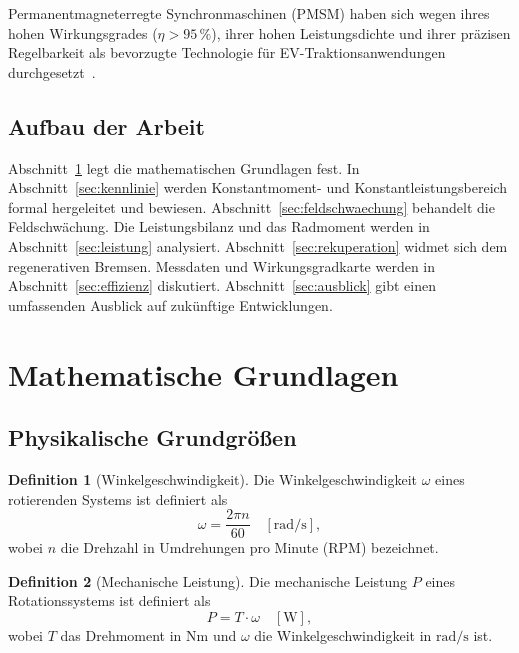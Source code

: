﻿\documentclass[a4paper,12pt]{article}
\theoremstyle{definition}
\newtheorem{definition}{Definition}
\begin{document}
Permanentmagneterregte Synchronmaschinen (PMSM) haben sich wegen ihres hohen
Wirkungsgrades ($\eta > 95\,\%$), ihrer hohen Leistungsdichte und ihrer präzisen
Regelbarkeit als bevorzugte Technologie für EV-Traktionsanwendungen
durchgesetzt~\cite{bose2002modern,zhu2007electrical}.

\subsection{Aufbau der Arbeit}

Abschnitt~\ref{sec:grundlagen} legt die mathematischen Grundlagen fest. In
Abschnitt~\ref{sec:kennlinie} werden Konstantmoment- und Konstantleistungsbereich
formal hergeleitet und bewiesen. Abschnitt~\ref{sec:feldschwaechung} behandelt
die Feldschwächung. Die Leistungsbilanz und das Radmoment werden in
Abschnitt~\ref{sec:leistung} analysiert. Abschnitt~\ref{sec:rekuperation}
widmet sich dem regenerativen Bremsen. Messdaten und Wirkungsgradkarte werden in
Abschnitt~\ref{sec:effizienz} diskutiert. Abschnitt~\ref{sec:ausblick} gibt
einen umfassenden Ausblick auf zukünftige Entwicklungen.

\section{Mathematische Grundlagen}
\label{sec:grundlagen}

\subsection{Physikalische Grundgrößen}

\begin{definition}[Winkelgeschwindigkeit]
    Die Winkelgeschwindigkeit $\omega$ eines rotierenden Systems ist definiert als
    \[
        \omega = \frac{2\pi n}{60} \quad \left[\si{\radian\per\second}\right],
    \]
    wobei $n$ die Drehzahl in Umdrehungen pro Minute (RPM) bezeichnet.
\end{definition}

\begin{definition}[Mechanische Leistung]
    Die mechanische Leistung $P$ eines Rotationssystems ist definiert als
    \[
        P = T \cdot \omega \quad [\si{\watt}],
    \]
    wobei $T$ das Drehmoment in $\si{\newton\metre}$ und $\omega$ die
    Winkelgeschwindigkeit in $\si{\radian\per\second}$ ist.
\end{definition}
\end{document}

